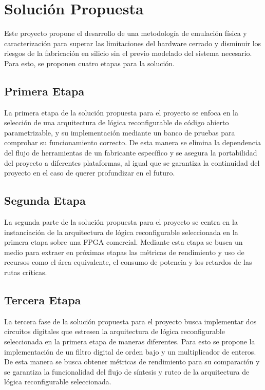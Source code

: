 \chapter{Solución Propuesta}
\label{ch:solucion}

Este proyecto propone el desarrollo de una metodología de emulación física y caracterización para 
superar las limitaciones del hardware cerrado y disminuir los riesgos de la fabricación en 
silicio sin el previo modelado del sistema necesario. Para esto, se proponen cuatro etapas 
para la solución.

\section{Primera Etapa}

La primera etapa de la solución propuesta para el proyecto se enfoca en la selección de 
una arquitectura de lógica reconfigurable de código abierto parametrizable, y su 
implementación mediante un banco de pruebas para comprobar su funcionamiento correcto. De 
esta manera se elimina la dependencia del flujo de herramientas de un fabricante específico 
y se asegura la portabilidad del proyecto a diferentes plataformas, al igual que se garantiza 
la continuidad del proyecto en el caso de querer profundizar en el futuro.

\section{Segunda Etapa}

La segunda parte de la solución propuesta para el proyecto se centra en la instanciación de 
la arquitectura de lógica reconfigurable seleccionada en la primera etapa sobre una FPGA 
comercial. Mediante esta etapa se busca un medio para extraer en próximas etapas las métricas 
de rendimiento y uso de recursos como el área equivalente, el consumo de potencia y los 
retardos de las rutas críticas.

\section{Tercera Etapa}

La tercera fase de la solución propuesta para el proyecto busca implementar dos circuitos 
digitales que estresen la arquitectura de lógica reconfigurable seleccionada en la primera 
etapa de maneras diferentes. Para esto se propone la implementación de un filtro digital 
de orden bajo y un multiplicador de enteros. De esta manera se busca obtener métricas de 
rendimiento para su comparación y se garantiza la funcionalidad del flujo de síntesis y 
ruteo de la arquitectura de lógica reconfigurable seleccionada.

